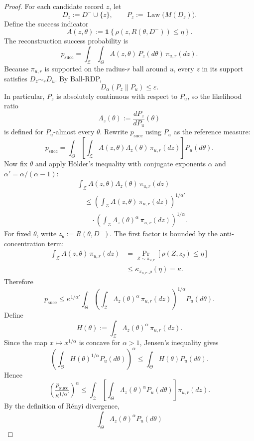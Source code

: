 \documentclass[conference,compsoc]{IEEEtran}
\DeclareMathOperator{\Law}{Law}
\newcommand{\ind}[1]{\mathbf{1}\!\left\{#1\right\}}
\begin{document}
\begin{proof}
For each candidate record $z$, let
\[
D_z:=D^-\cup\{z\},
\qquad
P_z:=\Law\big(M(D_z)\big).
\]
Define the success indicator
\[
A(z,\theta):=\ind{\rho(z,R(\theta,D^-))\le \eta}.
\]
The reconstruction success probability is
\[
p_{\mathrm{succ}}
=
\int_{\mathcal{Z}}\int_{\Theta} A(z,\theta)\,P_z(d\theta)\,\pi_{u,r}(dz).
\]
Because $\pi_{u,r}$ is supported on the radius-$r$ ball around $u$, every $z$ in its support satisfies $D_z\sim_r D_u$. By Ball-RDP,
\[
D_\alpha(P_z\|P_u)\le \varepsilon.
\]
In particular, $P_z$ is absolutely continuous with respect to $P_u$, so the likelihood ratio
\[
\Lambda_z(\theta):=\frac{dP_z}{dP_u}(\theta)
\]
is defined for $P_u$-almost every $\theta$. Rewrite $p_{\mathrm{succ}}$ using $P_u$ as the reference measure:
\[
p_{\mathrm{succ}}
=
\int_{\Theta}
\left[
\int_{\mathcal{Z}} A(z,\theta)\Lambda_z(\theta)\,\pi_{u,r}(dz)
\right]
P_u(d\theta).
\]
Now fix $\theta$ and apply Hölder's inequality with conjugate exponents
$\alpha$ and $\alpha'=\alpha/(\alpha-1)$:
\[
\begin{aligned}
&\int_{\mathcal{Z}}
A(z,\theta)\Lambda_z(\theta)\,\pi_{u,r}(dz) \\
&\quad\le
\left(
\int_{\mathcal{Z}}
A(z,\theta)\,\pi_{u,r}(dz)
\right)^{1/\alpha'} \\
&\qquad\cdot
\left(
\int_{\mathcal{Z}}
\Lambda_z(\theta)^\alpha\,\pi_{u,r}(dz)
\right)^{1/\alpha}.
\end{aligned}
\]
For fixed $\theta$, write $z_\theta:=R(\theta,D^-)$. The first factor is
bounded by the anti-concentration term:
\[
\begin{aligned}
\int_{\mathcal{Z}} A(z,\theta)\,\pi_{u,r}(dz)
&=
\Pr_{Z\sim\pi_{u,r}}
[\rho(Z,z_\theta)\le \eta] \\
&\le
\kappa_{\pi_{u,r},\rho}(\eta)
=
\kappa.
\end{aligned}
\]
Therefore
\[
p_{\mathrm{succ}}
\le
\kappa^{1/\alpha'}
\int_{\Theta}
\left(\int_{\mathcal{Z}} \Lambda_z(\theta)^\alpha\,\pi_{u,r}(dz)\right)^{1/\alpha}
P_u(d\theta).
\]
Define
\[
H(\theta):=\int_{\mathcal{Z}} \Lambda_z(\theta)^\alpha\,\pi_{u,r}(dz).
\]
Since the map $x\mapsto x^{1/\alpha}$ is concave for $\alpha>1$, Jensen's inequality gives
\[
\left(
\int_{\Theta} H(\theta)^{1/\alpha}P_u(d\theta)
\right)^\alpha
\le
\int_{\Theta} H(\theta)P_u(d\theta).
\]
Hence
\[
\left(\frac{p_{\mathrm{succ}}}{\kappa^{1/\alpha'}}\right)^\alpha
\le
\int_{\mathcal{Z}}
\left[
\int_{\Theta} \Lambda_z(\theta)^\alpha P_u(d\theta)
\right]
\pi_{u,r}(dz).
\]
By the definition of Rényi divergence,
\[
\int_{\Theta} \Lambda_z(\theta)^\alpha P_u(d\theta)
\]
\end{proof}
\end{document}
